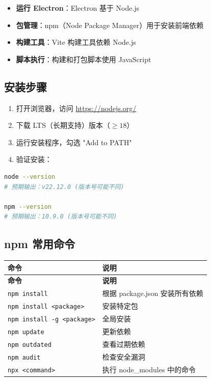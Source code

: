 ﻿\documentclass[12pt,a4paper,oneside]{ctexbook}
\begin{document}
\begin{itemize}
    \item \textbf{运行 Electron}：Electron 基于 Node.js
    \item \textbf{包管理}：npm（Node Package Manager）用于安装前端依赖
    \item \textbf{构建工具}：Vite 构建工具依赖 Node.js
    \item \textbf{脚本执行}：构建和打包脚本使用 JavaScript
\end{itemize}

\subsection{安装步骤}

\begin{enumerate}
    \item 打开浏览器，访问 \url{https://nodejs.org/}
    \item 下载 LTS（长期支持）版本（\(\geq 18\)）
    \item 运行安装程序，勾选 "Add to PATH"
    \item 验证安装：
\end{enumerate}

\begin{lstlisting}[language=bash, caption={验证 Node.js 安装}]
node --version
# 预期输出：v22.12.0 (版本号可能不同)

npm --version
# 预期输出：10.9.0 (版本号可能不同)
\end{lstlisting}

\subsection{npm 常用命令}

\begin{longtable}{p{5cm}p{8cm}}
    \toprule
    \textbf{命令} & \textbf{说明} \\
    \midrule
    \endfirsthead
    \toprule
    \textbf{命令} & \textbf{说明} \\
    \midrule
    \endhead
    \bottomrule
    \endfoot
    \texttt{npm install} & 根据 package.json 安装所有依赖 \\
    \texttt{npm install <package>} & 安装特定包 \\
    \texttt{npm install -g <package>} & 全局安装 \\
    \texttt{npm update} & 更新依赖 \\
    \texttt{npm outdated} & 查看过期依赖 \\
    \texttt{npm audit} & 检查安全漏洞 \\
    \texttt{npx <command>} & 执行 node\_modules 中的命令 \\
    \bottomrule
\end{longtable}
\end{document}
